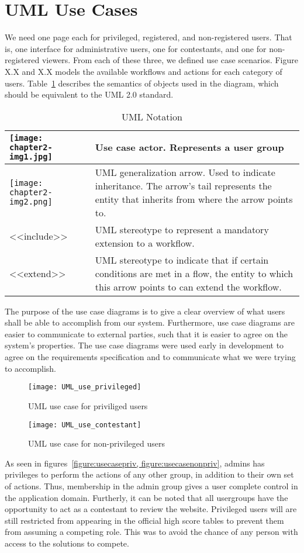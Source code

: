 \section{UML Use Cases}
We need one page each for privileged, registered, and non-registered
users. That is, one interface for administrative users, one for
contestants, and one for non-registered viewers. From each of these
three, we defined use case scenarios. Figure X.X and X.X models the
available workflows and actions for each category of users.
Table~\ref{table:uml-notation} describes the semantics of objects used in the
diagram, which should be equivalent to the UML 2.0 standard.
\begin{longtable}{|m{}|m{}|}
\caption{UML Notation} \label{table:uml-notation} \\
\hline
	\texttt{[image: chapter2-img1.jpg]}  &
Use case actor. Represents a user group\\\hline
	\texttt{[image: chapter2-img2.png]}  &
UML generalization arrow. Used to indicate inheritance. The
arrow's tail represents the entity that
inherits from where the arrow points to.\\\hline
{\textless}{\textless}include{\textgreater}{\textgreater} &
UML stereotype to represent a mandatory extension to a
workflow.\\\hline
{\textless}{\textless}extend{\textgreater}{\textgreater} &
UML stereotype to indicate that if certain conditions are met in a flow,
the entity to which this arrow points to can extend the
workflow.\\\hline
\end{longtable}

The purpose of the use case diagrams is to give a clear overview of what
users shall be able to accomplish from our system. Furthermore, use
case diagrams are easier to communicate to external parties, such that
it is easier to agree on the system's properties. The
use case diagrams were used early in development to agree on the
requirements specification and to communicate what we
were trying to accomplish.

\begin{figure}[h!]
    \texttt{[image: UML\_use\_privileged]}
    \caption{UML use case for priviliged users} \label{figure:usecasepriv}
\end{figure}

\begin{figure}[h!]
    \texttt{[image: UML\_use\_contestant]}
    \caption{UML use case for non-privileged users} \label{figure:usecasenonpriv}
\end{figure}
As seen in figures~\cref{figure:usecasepriv, figure:usecasenonpriv}, admins
has privileges to perform the actions of any other group, in addition to
their own set of actions. Thus, membership in the admin group gives a user
complete control in the application domain. Furtherly, it can be noted that
all usergroups have the opportunity to act as a contestant to review the
website. Privileged users will are still restricted from appearing in the
official high score tables to prevent them from assuming a competing role.
This was to avoid the chance of any person with access to the solutions to
compete.
